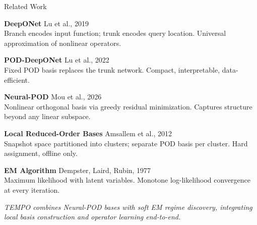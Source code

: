 \documentclass[aspectratio=169]{beamer}
\begin{document}
\begin{frame}{Related Work}

\begin{itemize}
  \setlength\itemsep{0.55em}

  \textbf{DeepONet} \hfill {\footnotesize Lu et al., 2019}\\
    {\small Branch encodes input function; trunk encodes query location.
    Universal approximation of nonlinear operators.}

   \textbf{POD-DeepONet} \hfill {\footnotesize Lu et al., 2022}\\
    {\small Fixed POD basis replaces the trunk network.
    Compact, interpretable, data-efficient.}

   \textbf{Neural-POD} \hfill {\footnotesize Mou et al., 2026}\\
    {\small Nonlinear orthogonal basis via greedy residual minimization.
    Captures structure beyond any linear subspace.}

   \textbf{Local Reduced-Order Bases} \hfill {\footnotesize Amsallem et al., 2012}\\
    {\small Snapshot space partitioned into clusters; separate POD basis
    per cluster. Hard assignment, offline only.}

   \textbf{EM Algorithm} \hfill {\footnotesize Dempster, Laird, Rubin, 1977}\\
    {\small Maximum likelihood with latent variables.
    Monotone log-likelihood convergence at every iteration.}

\end{itemize}

\vspace{0.1cm}
{\footnotesize\textit{TEMPO combines Neural-POD bases with soft EM regime discovery,
integrating local basis construction and operator learning end-to-end.}}

\end{frame}
\end{document}
